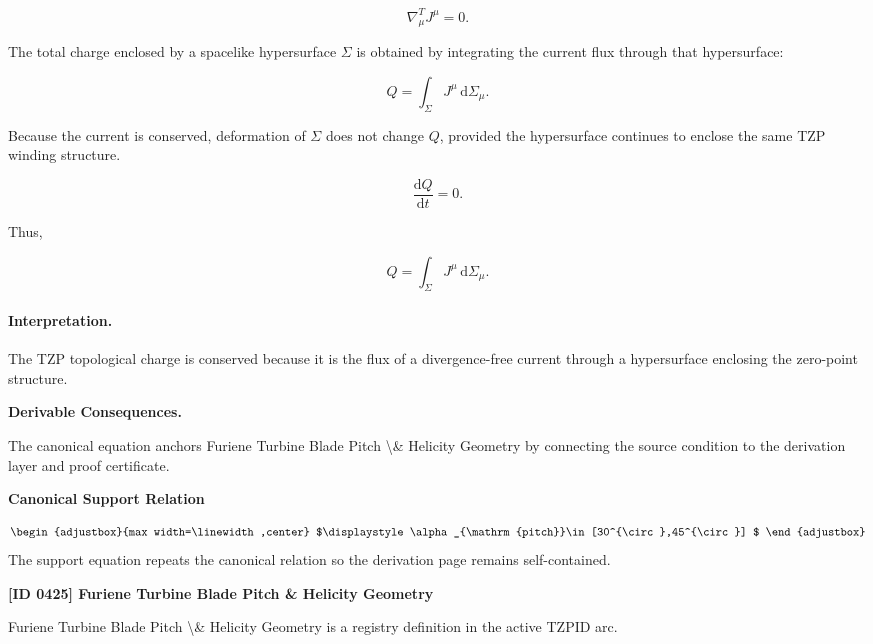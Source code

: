 \begin{equation}
\nabla^T_\mu J^\mu = 0 .
\end{equation}

The total charge enclosed by a spacelike hypersurface $\Sigma$ is obtained by integrating the current flux through that hypersurface:

\begin{equation}
Q
=
\int_{\Sigma}
J^\mu
\,\mathrm{d}\Sigma_\mu .
\end{equation}

Because the current is conserved, deformation of $\Sigma$ does not change $Q$, provided the hypersurface continues to enclose the same TZP winding structure.

\begin{equation}
\frac{\mathrm{d}Q}{\mathrm{d}t}=0 .
\end{equation}

Thus,

\begin{equation}
\boxed{
Q
=
\int_{\Sigma}
J^\mu
\,\mathrm{d}\Sigma_\mu .
}
\end{equation}

\paragraph{Interpretation.}
The TZP topological charge is conserved because it is the flux of a divergence-free current through a hypersurface enclosing the zero-point structure.

\par\vspace{0.35em}
\noindent\textbf{Derivable Consequences.}\quad
\begingroup
\footnotesize
\raggedright
The canonical equation anchors Furiene Turbine Blade Pitch \textbackslash{}\& Helicity Geometry by connecting the source condition to the derivation layer and proof certificate.
\par\endgroup

\noindent\textbf{Canonical Support Relation}\par
\[
\begin{adjustbox}{max width=\linewidth,center}
$\displaystyle
\alpha_{\mathrm{pitch}}\in[30^{\circ},45^{\circ}]
$
\end{adjustbox}
\]
\noindent The support equation repeats the canonical relation so the derivation page remains self-contained.\par

\clearpage
\noindent\textbf{[ID 0425] Furiene Turbine Blade Pitch \& Helicity Geometry}\par
\vspace{0.35em}
\begingroup\small
{}
Furiene Turbine Blade Pitch \textbackslash{}\& Helicity Geometry is a registry definition in the active TZPID arc.

